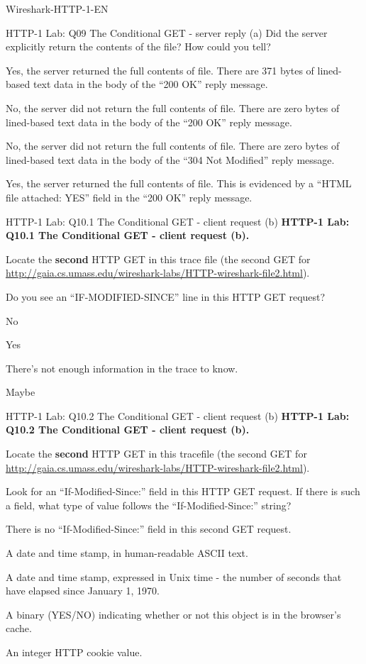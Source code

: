\documentclass[a4paper]{article}
\begin{document}
\begin{quiz}{Wireshark-HTTP-1-EN}
\begin{multi}[points=1,shuffle]{HTTP-1 Lab: Q09 The Conditional GET - server reply (a)}
Did the server explicitly return the contents of the file? How could you tell? 
\item* Yes, the server returned the full contents of file. There are 371 bytes of lined-based text data in the body of the ``200 OK'' reply message.
\item No, the server did not return the full contents of file. There are zero bytes of lined-based text data in the body of the ``200 OK'' reply message.
\item No, the server did not return the full contents of file. There are zero bytes of lined-based text data in the body of the ``304 Not Modified'' reply message.
\item Yes, the server returned the full contents of file. This is evidenced by a ``HTML file attached: YES'' field in the ``200 OK'' reply message.
\end{multi}

\begin{multi}[points=1,shuffle]{HTTP-1 Lab: Q10.1 The Conditional GET - client request (b)}
\textbf{HTTP-1 Lab: Q10.1 The Conditional GET - client request (b).} 

Locate the \textbf{second} HTTP GET in this trace file (the second GET for \href{http://gaia.cs.umass.edu/wireshark-labs/HTTP-wireshark-file2.html}{http://gaia.cs.umass.edu/wireshark-labs/HTTP-wireshark-file2.html}).

Do you see an ``IF-MODIFIED-SINCE'' line in this HTTP GET request? 
\item No
\item* Yes
\item There's not enough information in the trace to know.
\item Maybe
\end{multi}

\begin{multi}[points=1,shuffle]{HTTP-1 Lab: Q10.2 The Conditional GET - client request (b)}
\textbf{HTTP-1 Lab: Q10.2 The Conditional GET - client request (b).} 

Locate the \textbf{second} HTTP GET in this tracefile (the second GET for \href{http://gaia.cs.umass.edu/wireshark-labs/HTTP-wireshark-file2.html}{http://gaia.cs.umass.edu/wireshark-labs/HTTP-wireshark-file2.html}).

Look for an ``If-Modified-Since:'' field in this HTTP GET request.  If there is such a field, what type of value follows the ``If-Modified-Since:'' string? 
\item There is no ``If-Modified-Since:'' field in this second GET request.
\item* A date and time stamp, in human-readable ASCII text.
\item A date and time stamp, expressed in Unix time - the number of seconds that have elapsed since January 1, 1970.
\item A binary (YES/NO) indicating whether or not this object is in the browser's cache.
\item An integer HTTP cookie value.
\end{multi}


\end{quiz}
\end{document}

